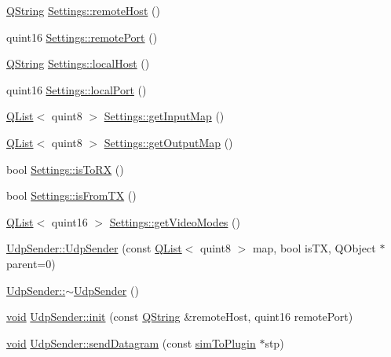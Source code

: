 \begin{DoxyCompactItemize}
\item 
\hyperlink{group___u_a_v_objects_plugin_gab9d252f49c333c94a72f97ce3105a32d}{Q\-String} \hyperlink{group___aero_sim_r_c_ga488c7f5a87b95d6b3e0b8d8c0647f984}{Settings\-::remote\-Host} ()
\item 
quint16 \hyperlink{group___aero_sim_r_c_gafd3c776de1db18a53414fc9ff7d5f656}{Settings\-::remote\-Port} ()
\item 
\hyperlink{group___u_a_v_objects_plugin_gab9d252f49c333c94a72f97ce3105a32d}{Q\-String} \hyperlink{group___aero_sim_r_c_gaf2ca84445d77cc2649ac0aa4958051f0}{Settings\-::local\-Host} ()
\item 
quint16 \hyperlink{group___aero_sim_r_c_gadb246f8a0f4976071e8e302b553df863}{Settings\-::local\-Port} ()
\item 
\hyperlink{class_q_list}{Q\-List}$<$ quint8 $>$ \hyperlink{group___aero_sim_r_c_ga6607c28a72f6470cd410ac7baf8fba49}{Settings\-::get\-Input\-Map} ()
\item 
\hyperlink{class_q_list}{Q\-List}$<$ quint8 $>$ \hyperlink{group___aero_sim_r_c_ga9c382b0fc01ca068ccf9f0226d707bc9}{Settings\-::get\-Output\-Map} ()
\item 
bool \hyperlink{group___aero_sim_r_c_ga80495f779a8152a0c16eed12fcfd69e4}{Settings\-::is\-To\-R\-X} ()
\item 
bool \hyperlink{group___aero_sim_r_c_gaa18f01bc8cd2c71856c0b13cc9fc3745}{Settings\-::is\-From\-T\-X} ()
\item 
\hyperlink{class_q_list}{Q\-List}$<$ quint16 $>$ \hyperlink{group___aero_sim_r_c_ga885d740d0bc91afd8207ef878147e0d7}{Settings\-::get\-Video\-Modes} ()
\item 
\hyperlink{group___aero_sim_r_c_ga33d974a790381e7266d6d4c57ca40f1f}{Udp\-Sender\-::\-Udp\-Sender} (const \hyperlink{class_q_list}{Q\-List}$<$ quint8 $>$ map, bool is\-T\-X, Q\-Object $\ast$parent=0)
\item 
\hyperlink{group___aero_sim_r_c_gaa3cfe219b7bfa771b77b85dacc5d5e50}{Udp\-Sender\-::$\sim$\-Udp\-Sender} ()
\item 
\hyperlink{group___u_a_v_objects_plugin_ga444cf2ff3f0ecbe028adce838d373f5c}{void} \hyperlink{group___aero_sim_r_c_ga14593f9c2d83a4feb7c05639f521cd58}{Udp\-Sender\-::init} (const \hyperlink{group___u_a_v_objects_plugin_gab9d252f49c333c94a72f97ce3105a32d}{Q\-String} \&remote\-Host, quint16 remote\-Port)
\item 
\hyperlink{group___u_a_v_objects_plugin_ga444cf2ff3f0ecbe028adce838d373f5c}{void} \hyperlink{group___aero_sim_r_c_ga1c5e2d6839935b0860fc2bb6912ec125}{Udp\-Sender\-::send\-Datagram} (const \hyperlink{structsim_to_plugin}{sim\-To\-Plugin} $\ast$stp)

\end{DoxyCompactItemize}
